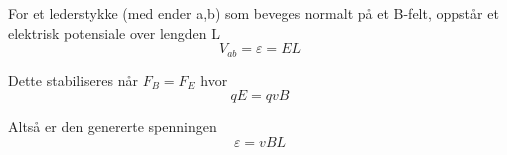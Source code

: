 For et lederstykke (med ender a,b) som beveges normalt på et B-felt,
oppstår et elektrisk potensiale over lengden L
$$V_{ab} = \varepsilon = EL$$

Dette stabiliseres når $F_B = F_E$ hvor
$$qE = qvB$$

Altså er den genererte spenningen
$$\varepsilon = vBL$$
